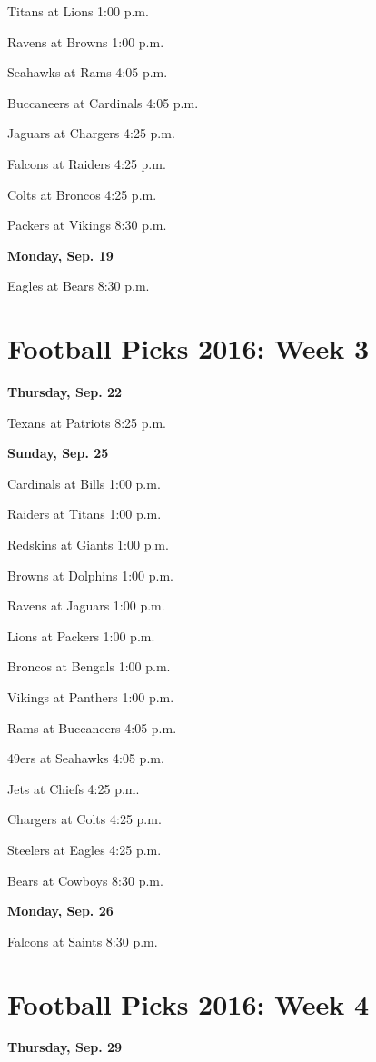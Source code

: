 \documentclass[12pt, letterpaper]{article}
\begin{document}
Titans at Lions 1:00 p.m.\par
Ravens at Browns 1:00 p.m.\par
Seahawks at Rams 4:05 p.m.\par
Buccaneers at Cardinals 4:05 p.m.\par
Jaguars at Chargers 4:25 p.m.\par
Falcons at Raiders 4:25 p.m.\par
Colts at Broncos 4:25 p.m.\par
Packers at Vikings 8:30 p.m.\par
\noindent \Large \textbf{Monday, Sep. 19} \par
Eagles at Bears 8:30 p.m.\par
\newpage \section*{\Huge Football Picks 2016: Week 3}
\noindent \Large \textbf{Thursday, Sep. 22} \par
Texans at Patriots 8:25 p.m.\par
\noindent \Large \textbf{Sunday, Sep. 25} \par
Cardinals at Bills 1:00 p.m.\par
Raiders at Titans 1:00 p.m.\par
Redskins at Giants 1:00 p.m.\par
Browns at Dolphins 1:00 p.m.\par
Ravens at Jaguars 1:00 p.m.\par
Lions at Packers 1:00 p.m.\par
Broncos at Bengals 1:00 p.m.\par
Vikings at Panthers 1:00 p.m.\par
Rams at Buccaneers 4:05 p.m.\par
49ers at Seahawks 4:05 p.m.\par
Jets at Chiefs 4:25 p.m.\par
Chargers at Colts 4:25 p.m.\par
Steelers at Eagles 4:25 p.m.\par
Bears at Cowboys 8:30 p.m.\par
\noindent \Large \textbf{Monday, Sep. 26} \par
Falcons at Saints 8:30 p.m.\par
\newpage \section*{\Huge Football Picks 2016: Week 4}
\noindent \Large \textbf{Thursday, Sep. 29} \par
\end{document}
